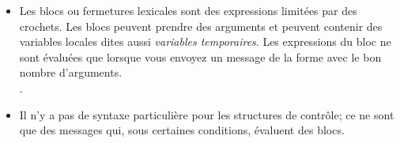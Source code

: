 \documentclass[a4paper,10pt,twoside]{book}
\begin{document}
\begin{itemize}
\item	Les blocs ou fermetures lexicales sont des expressions limit\'{e}es par des crochets.
		Les blocs peuvent prendre des arguments et peuvent contenir
        des variables locales dites aussi \emph{variables temporaires}.
		Les expressions du bloc ne sont \'{e}valu\'{e}es que lorsque
        vous envoyez un message de la forme  avec le bon nombre d'arguments.\\
		.

\item	Il n'y a pas de syntaxe particuli\`{e}re pour les structures
  de contr\^{o}le; ce ne sont que des messages qui, sous certaines conditions, \'{e}valuent des blocs.\\

\end{itemize}

\ifx\wholebook\relax\else
\end{document}
